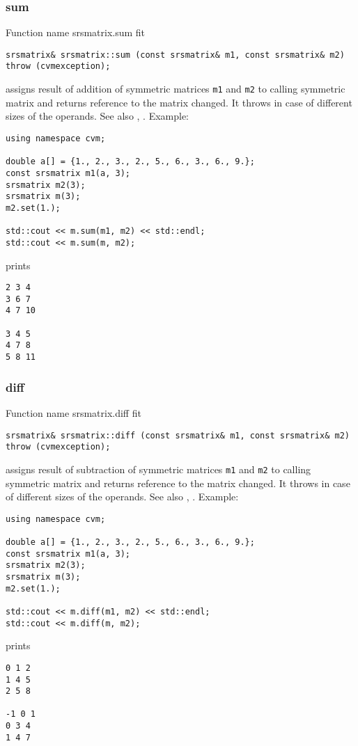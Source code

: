 \subsubsection{sum}
Function%
\pdfdest name {srsmatrix.sum} fit
\begin{verbatim}
srsmatrix& srsmatrix::sum (const srsmatrix& m1, const srsmatrix& m2)
throw (cvmexception);
\end{verbatim}
assigns  result of addition of symmetric
matrices \verb"m1" and \verb"m2"  to  calling symmetric matrix
and returns  reference to
the matrix changed.
It throws  
in case of different sizes of the operands.
See also ,
.
Example:
\begin{Verbatim}
using namespace cvm;

double a[] = {1., 2., 3., 2., 5., 6., 3., 6., 9.};
const srsmatrix m1(a, 3);
srsmatrix m2(3);
srsmatrix m(3);
m2.set(1.);

std::cout << m.sum(m1, m2) << std::endl;
std::cout << m.sum(m, m2);
\end{Verbatim}
prints
\begin{Verbatim}
2 3 4
3 6 7
4 7 10

3 4 5
4 7 8
5 8 11
\end{Verbatim}
\newpage



\subsubsection{diff}
Function%
\pdfdest name {srsmatrix.diff} fit
\begin{verbatim}
srsmatrix& srsmatrix::diff (const srsmatrix& m1, const srsmatrix& m2)
throw (cvmexception);
\end{verbatim}
assigns  result of subtraction of
symmetric matrices \verb"m1" and \verb"m2" to  calling symmetric matrix
and returns  reference to
the matrix changed.
It throws  
in case of different sizes of the operands.
See also ,
.
Example:
\begin{Verbatim}
using namespace cvm;

double a[] = {1., 2., 3., 2., 5., 6., 3., 6., 9.};
const srsmatrix m1(a, 3);
srsmatrix m2(3);
srsmatrix m(3);
m2.set(1.);

std::cout << m.diff(m1, m2) << std::endl;
std::cout << m.diff(m, m2);
\end{Verbatim}
prints
\begin{Verbatim}
0 1 2
1 4 5
2 5 8

-1 0 1
0 3 4
1 4 7
\end{Verbatim}
\newpage



